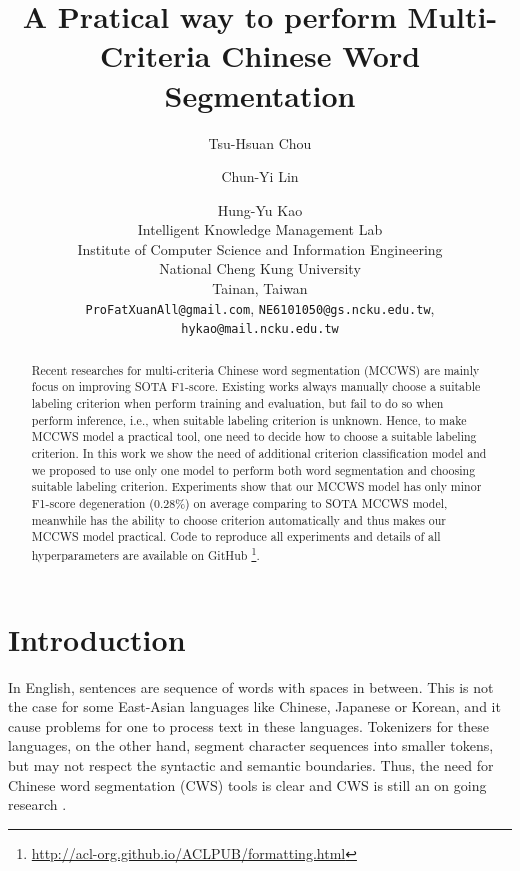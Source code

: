 \documentclass[11pt]{article}
\title{A Pratical way to perform Multi-Criteria Chinese Word Segmentation}
\author{Tsu-Hsuan Chou \and Chun-Yi Lin \and Hung-Yu Kao \\
Intelligent Knowledge Management Lab \\
Institute of Computer Science and Information Engineering \\
National Cheng Kung University \\
Tainan, Taiwan \\
  \texttt{ProFatXuanAll@gmail.com}, \texttt{NE6101050@gs.ncku.edu.tw}, \\
  \texttt{hykao@mail.ncku.edu.tw}
}
\begin{document}
\maketitle
\begin{abstract}
  Recent researches for multi-criteria Chinese word segmentation (MCCWS) are mainly focus on improving SOTA F1-score.
  Existing works always manually choose a suitable labeling criterion when perform training and evaluation, but fail to do so when perform inference, i.e., when suitable labeling criterion is unknown.
  Hence, to make MCCWS model a practical tool, one need to decide how to choose a suitable labeling criterion.
  In this work we show the need of additional criterion classification model and we proposed to use only one model to perform both word segmentation and choosing suitable labeling criterion.
  Experiments show that our MCCWS model has only minor F1-score degeneration (\(0.28\%\)) on average comparing to SOTA MCCWS model, meanwhile has the ability to choose criterion automatically and thus makes our MCCWS model practical.
  Code to reproduce all experiments and details of all hyperparameters are available on GitHub \footnote{\url{http://acl-org.github.io/ACLPUB/formatting.html}}.
\end{abstract}

\section{Introduction}

In English, sentences are sequence of words with spaces in between.
This is not the case for some East-Asian languages like Chinese, Japanese or Korean, and it cause problems for one to process text in these languages.
Tokenizers for these languages, on the other hand, segment character sequences into smaller tokens, but may not respect the syntactic and semantic boundaries.
Thus, the need for Chinese word segmentation (CWS) tools is clear and CWS is still an on going research \cite{chen-etal-2017-adversarial,ma-etal-2018-state,He-2019-effective,Gong-2019-switch,huang-etal-2020-towards,huang-etal-2020-joint-multiple,ke2020unified,qiu-etal-2020-concise,ke-etal-2021-pre,tong-etal-2022-word}.
\end{document}
